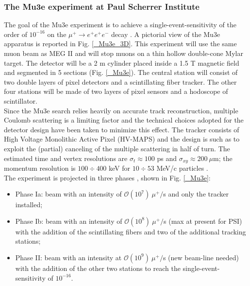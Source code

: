 \documentclass[12pt,a4paper,openright, oneside, titlepage]{book} %
\begin{document}
\subsubsection{The Mu3e experiment at Paul Scherrer Institute}
The goal of the Mu3e experiment is to achieve a single-event-sensitivity of  the order of $10^{-16}$ on the $\mu^+ \rightarrow e^+ e^+e^-$ decay \cite{Mu3e:2016}. 
A pictorial view of the Mu3e apparatus is reported in Fig. \ref{_Mu3e_3D}.  
This experiment will use the same muon beam as MEG II and will stop muons on a thin hollow double-cone Mylar target. 
The detector will be a 2 m cylinder placed inside a 1.5 T magnetic field and segmented in 5 sections (Fig. \ref{_Mu3e}). 
The central station will consist of two double layers of pixel detectors and a scintillating fiber tracker. 
The other four stations will be made of two layers of pixel sensors and a hodoscope of scintillator. \\
Since the Mu3e search relies heavily on accurate track reconstruction, multiple Coulomb scattering is a limiting factor and the technical choices adopted for the detector design have been taken to minimize this effect. 
The tracker consists of High Voltage Monolithic Active Pixel (HV-MAPS) and the design is such as to exploit the (partial) canceling of the multiple scattering in half of turn. 
The estimated time and vertex resolutions are $\sigma_t\approx 100$ ps  and $\sigma_{xy}\approx 200\ \mu$m; the momentum resolution is $100\div400$ keV for $10\div53$ MeV/c particles \cite{Papa}\cite{Signorelli}.\\
The experiment is projected in three phases  \cite{Signorelli}, shown in Fig. \ref{_Mu3e}:
\begin{itemize}
\item Phase Ia: beam with an intensity of $\mathcal{O}(10^7)\ \mu^+/$s and only the tracker installed;
\item Phase Ib: beam with an intensity of $\mathcal{O}(10^8)\ \mu^+/$s (max at present for PSI) 
with the addition of the scintillating fibers and two of the additional tracking stations;
\item Phase II: beam with an intensity at $\mathcal{O}(10^9)\ \mu^+/$s (new beam-line needed) 
with the addition of the other two stations to reach the single-event-sensitivity of $10^{-16}$.
\end{itemize}
\end{document}
